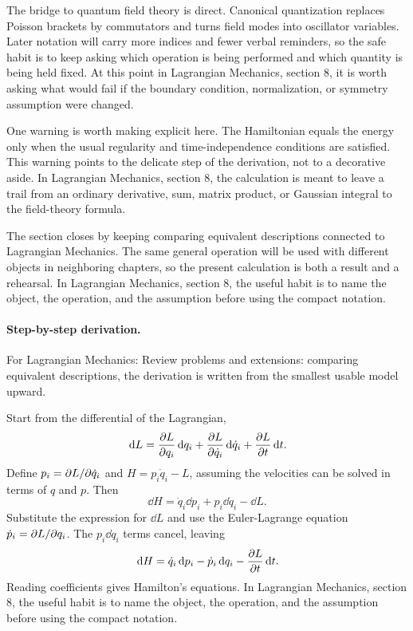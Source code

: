 The bridge to quantum field theory is direct.  Canonical quantization replaces Poisson brackets by commutators and turns field modes into oscillator variables.  Later notation will carry more indices and fewer verbal reminders, so the safe habit is to keep asking which operation is being performed and which quantity is being held fixed.  At this point in Lagrangian Mechanics, section 8, it is worth asking what would fail if the boundary condition, normalization, or symmetry assumption were changed.

One warning is worth making explicit here.  The Hamiltonian equals the energy only when the usual regularity and time-independence conditions are satisfied.  This warning points to the delicate step of the derivation, not to a decorative aside.  In Lagrangian Mechanics, section 8, the calculation is meant to leave a trail from an ordinary derivative, sum, matrix product, or Gaussian integral to the field-theory formula.

The section closes by keeping comparing equivalent descriptions connected to Lagrangian Mechanics.  The same general operation will be used with different objects in neighboring chapters, so the present calculation is both a result and a rehearsal.  In Lagrangian Mechanics, section 8, the useful habit is to name the object, the operation, and the assumption before using the compact notation.



\paragraph{Step-by-step derivation.}

For Lagrangian Mechanics: Review problems and extensions: comparing equivalent descriptions, the derivation is written from the smallest usable model upward.

Start from the differential of the Lagrangian,
\[
  \,\mathrm d L=\frac{\partial L}{\partial q_i}\,\mathrm d q_i+\frac{\partial L}{\partial\dot q_i}\,\mathrm d\dot q_i+\frac{\partial L}{\partial t}\,\mathrm d t.
\]
Define \(p_i=\partial L/\partial\dot q_i\) and \(H=p_i\dot q_i-L\), assuming the velocities can be solved in terms of \(q\) and \(p\).  Then
\[
  \dd H=\dot q_i\dd p_i+p_i\dd\dot q_i-\dd L.
\]
Substitute the expression for \(\dd L\) and use the Euler-Lagrange equation \(\dot p_i=\partial L/\partial q_i\).  The \(p_i\dd\dot q_i\) terms cancel, leaving
\[
  \,\mathrm d H=\dot q_i\,\mathrm d p_i-\dot p_i\,\mathrm d q_i-\frac{\partial L}{\partial t}\,\mathrm d t.
\]
Reading coefficients gives Hamilton's equations.  In Lagrangian Mechanics, section 8, the useful habit is to name the object, the operation, and the assumption before using the compact notation.

